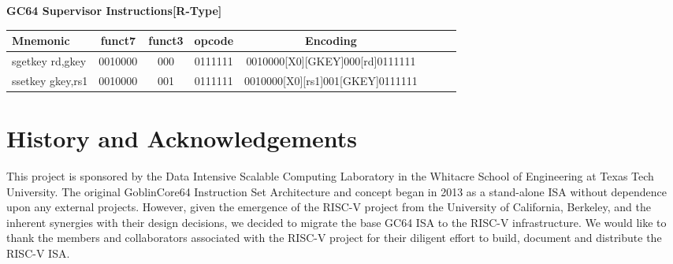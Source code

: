 \documentclass{article}
\begin{document}
\begin{center}
\begin{small}
\vspace{10 mm}

\textbf{GC64 Supervisor Instructions[R-Type]}
\begin{tabular}{| l | c | c | c | c | c | c || r}
\hline
Mnemonic & funct7 & funct3 & opcode & Encoding \\ \hline
\hline
sgetkey rd,gkey & 0010000 & 000 & 0111111 & 0010000[X0][GKEY]000[rd]0111111 \\ 
\hline
ssetkey gkey,rs1 & 0010000 & 001 & 0111111 & 0010000[X0][rs1]001[GKEY]0111111 \\ 
\hline
\end{tabular}


\end{small}
\end{center}


\section{History and Acknowledgements}

This project is sponsored by the Data Intensive Scalable Computing Laboratory in the Whitacre School of Engineering at Texas Tech University.  The original GoblinCore64 Instruction Set Architecture and concept began in 2013 as a stand-alone ISA without dependence upon any external projects.  However, given the emergence of the RISC-V project from the University of California, Berkeley, and the inherent synergies with their design decisions, we decided to migrate the base GC64 ISA to the RISC-V infrastructure.  We would like to thank the members and collaborators associated with the RISC-V project for their diligent effort to build, document and distribute the RISC-V ISA.  



\end{document}
